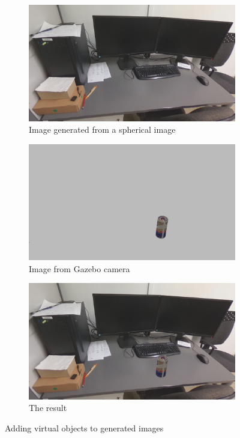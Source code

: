 \documentclass{svproc}
\begin{document}
\begin{figure}[!ht]
    \centering
    \begin{subfigure}{.46\textwidth}
        \includegraphics[width=\linewidth]{img/gazebo_integration/sim.jpg}
        \caption{Image generated from a spherical image}
        \vspace*{1em}
    \end{subfigure}\hfill%
    \begin{subfigure}{.46\textwidth}
        \includegraphics[width=\linewidth]{img/gazebo_integration/gazebo.jpg}
        \caption{Image from Gazebo camera}
        \vspace*{1em}
    \end{subfigure}
    \begin{subfigure}{\textwidth}
        \centering
        \includegraphics[width=0.5\linewidth]{img/gazebo_integration/sum.jpg}
        \caption{The result}
    \end{subfigure}
    \caption{Adding virtual objects to generated images}
    \label{fig:join}
\end{figure}
\end{document}
